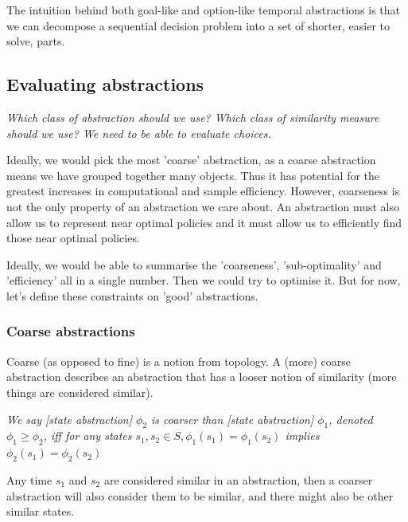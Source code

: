 The intuition behind both goal-like and option-like temporal abstractions is that
we can decompose a sequential decision problem into a set of shorter, easier to solve, parts.


\subsection{Evaluating abstractions}\label{eval-abstractions}

\begin{displayquote}
\textsl{
Which class of abstraction should we use?
Which class of similarity measure should we use?
We need to be able to evaluate choices.}
\end{displayquote}

Ideally, we would pick the most 'coarse' abstraction, as a coarse abstraction means we have grouped together many objects.
Thus it has potential for the greatest increases in computational and sample efficiency.
However, coarseness is not the only property of an abstraction we care about.
An abstraction must also allow us to represent near optimal policies and it must allow us
to efficiently find those near optimal policies.

Ideally, we would be able to summarise the 'coarseness', 'sub-optimality' and 'efficiency' all in a single number.
Then we could try to optimise it. But for now, let's define these constraints on 'good' abstractions.

\subsubsection{Coarse abstractions}


Coarse (as opposed to fine) is a notion from topology.
A (more) coarse abstraction describes an abstraction that has a looser
notion of similarity (more things are considered similar). \footnotemark


\textit{We say [state abstraction] $\phi_2$ is coarser than [state abstraction] $\phi_1$, denoted $\phi_1 \ge \phi_2$,
iff for any states $s_1, s_2 \in S, \phi_1(s_1) = \phi_1(s_2)$ implies $\phi_2(s_1) = \phi_2(s_2)$ \cite{Littman2006}}

Any time $s_1$ and $s_2$ are considered similar in an abstraction, then a coarser
abstraction will also consider them to be similar, and there might also be other similar states\footnotemark.

